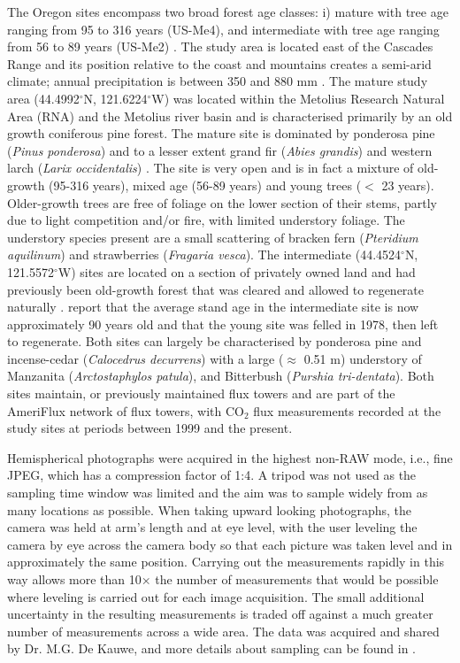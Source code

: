 The Oregon sites encompass two broad forest age classes: i) mature with tree age ranging from 95 to 316 years (US-Me4), and intermediate with tree age ranging from 56 to 89 years (US-Me2) \citep{Law2003}. The study area is located east of the Cascades Range and its position relative to the coast and mountains creates a semi-arid climate; annual precipitation is between 350 and 880 mm \citep{Law2001,Williams2005,Dekauwe2011}. 
The mature study area (44.4992$^{\circ}$N, 121.6224$^{\circ}$W) was located within the Metolius Research Natural Area (RNA) and the Metolius river basin and is characterised primarily by an old growth coniferous pine forest. The mature site is dominated by ponderosa pine (\textit{Pinus ponderosa}) and to a lesser extent grand fir (\textit{Abies grandis}) and western larch (\textit{Larix occidentalis}) \citep{Dekauwe2011}. The site is very open and is in fact a mixture of old-growth (95-316 years), mixed age (56-89 years) and young trees ($<$ 23 years). Older-growth trees are free of foliage on the lower section of their stems, partly due to light competition and/or fire, with limited understory foliage. The understory species present are a small scattering of bracken fern (\textit{Pteridium aquilinum}) and strawberries (\textit{Fragaria vesca}). 
The intermediate (44.4524$^{\circ}$N, 121.5572$^{\circ}$W) sites are located on a section of privately owned land and had previously been old-growth forest that was cleared and allowed to regenerate naturally \citep{Schwarz2004}. \citet{Schwarz2004} report that the average stand age in the intermediate site is now approximately
90 years old and that the young site was felled in 1978, then left to regenerate. Both sites can largely be characterised by ponderosa pine and incense-cedar (\textit{Calocedrus decurrens}) with a large ($\approx$ 0.51 m) understory of Manzanita (\textit{Arctostaphylos patula}), and Bitterbush (\textit{Purshia tri-dentata}). Both sites maintain, or previously maintained flux towers and are part of the AmeriFlux network of flux towers, with CO$_2$ flux measurements recorded at the study sites at periods between 1999 and the present. 

Hemispherical photographs were acquired in the highest non-RAW mode, i.e., fine JPEG, which has a compression factor of 1:4. A tripod was not used as the sampling time window was limited and the aim was to sample widely from as many locations as possible. When taking upward looking photographs, the camera was held at arm's
length and at eye level, with the user leveling the camera by eye across the camera body so that each picture was taken level and in approximately the same position. Carrying out the measurements rapidly in this way allows more than 10× the number of measurements that would be possible where leveling is carried out for each
image acquisition. The small additional uncertainty in the resulting measurements is traded off against a much greater number of measurements across a wide area. The data was acquired and shared by Dr. M.G. De Kauwe, and more details about sampling can be found in \citet{Dekauwe2011}.

